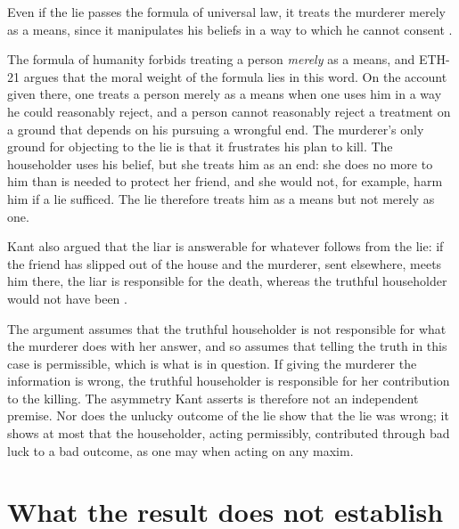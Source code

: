 \documentclass{situationist-preprint}
\begin{document}
\begin{objection}\label{o:fh}
Even if the lie passes the formula of universal law, it treats the murderer merely as a means, since it manipulates his beliefs in a way to which he cannot consent \citep{Korsgaard1986}.
\end{objection}

\begin{reply}
The formula of humanity forbids treating a person \emph{merely} as a means, and ETH-21 argues that the moral weight of the formula lies in this word. On the account given there, one treats a person merely as a means when one uses him in a way he could reasonably reject, and a person cannot reasonably reject a treatment on a ground that depends on his pursuing a wrongful end. The murderer's only ground for objecting to the lie is that it frustrates his plan to kill. The householder uses his belief, but she treats him as an end: she does no more to him than is needed to protect her friend, and she would not, for example, harm him if a lie sufficed. The lie therefore treats him as a means but not merely as one.
\end{reply}

\begin{objection}\label{o:conseq}
Kant also argued that the liar is answerable for whatever follows from the lie: if the friend has slipped out of the house and the murderer, sent elsewhere, meets him there, the liar is responsible for the death, whereas the truthful householder would not have been \citep{Kant1797}.
\end{objection}

\begin{reply}
The argument assumes that the truthful householder is not responsible for what the murderer does with her answer, and so assumes that telling the truth in this case is permissible, which is what is in question. If giving the murderer the information is wrong, the truthful householder is responsible for her contribution to the killing. The asymmetry Kant asserts is therefore not an independent premise. Nor does the unlucky outcome of the lie show that the lie was wrong; it shows at most that the householder, acting permissibly, contributed through bad luck to a bad outcome, as one may when acting on any maxim.
\end{reply}

\section{What the result does not establish}
\end{document}
